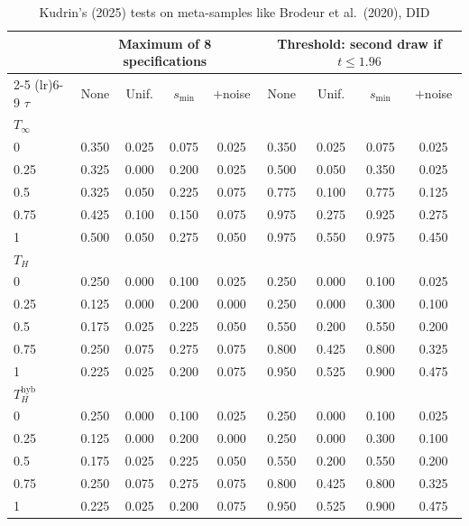 \begin{table}[htbp]
\centering
\caption{Kudrin's (2025) tests on meta-samples like Brodeur et al.\ (2020), DID}
\label{tab:brodeur_did_power_kudrin}
\footnotesize
\setlength{\tabcolsep}{4pt}
\begin{tabular}{lcccccccc}
\toprule
 & \multicolumn{4}{c}{Maximum of 8 specifications} & \multicolumn{4}{c}{Threshold: second draw if $t \le 1.96$} \\
\cmidrule(lr){2-5} \cmidrule(lr){6-9}
$\tau$ & None & Unif. & $s_{\min}$ & $+$noise & None & Unif. & $s_{\min}$ & $+$noise \\
\midrule
\multicolumn{9}{l}{\textit{$T_\infty$}} \\
0 & 0.350 & 0.025 & 0.075 & 0.025 & 0.350 & 0.025 & 0.075 & 0.025 \\
0.25 & 0.325 & 0.000 & 0.200 & 0.025 & 0.500 & 0.050 & 0.350 & 0.025 \\
0.5 & 0.325 & 0.050 & 0.225 & 0.075 & 0.775 & 0.100 & 0.775 & 0.125 \\
0.75 & 0.425 & 0.100 & 0.150 & 0.075 & 0.975 & 0.275 & 0.925 & 0.275 \\
1 & 0.500 & 0.050 & 0.275 & 0.050 & 0.975 & 0.550 & 0.975 & 0.450 \\
\midrule
\multicolumn{9}{l}{\textit{$T_H$}} \\
0 & 0.250 & 0.000 & 0.100 & 0.025 & 0.250 & 0.000 & 0.100 & 0.025 \\
0.25 & 0.125 & 0.000 & 0.200 & 0.000 & 0.250 & 0.000 & 0.300 & 0.100 \\
0.5 & 0.175 & 0.025 & 0.225 & 0.050 & 0.550 & 0.200 & 0.550 & 0.200 \\
0.75 & 0.250 & 0.075 & 0.275 & 0.075 & 0.800 & 0.425 & 0.800 & 0.325 \\
1 & 0.225 & 0.025 & 0.200 & 0.075 & 0.950 & 0.525 & 0.900 & 0.475 \\
\midrule
\multicolumn{9}{l}{\textit{$T_H^{\mathrm{hyb}}$}} \\
0 & 0.250 & 0.000 & 0.100 & 0.025 & 0.250 & 0.000 & 0.100 & 0.025 \\
0.25 & 0.125 & 0.000 & 0.200 & 0.000 & 0.250 & 0.000 & 0.300 & 0.100 \\
0.5 & 0.175 & 0.025 & 0.225 & 0.050 & 0.550 & 0.200 & 0.550 & 0.200 \\
0.75 & 0.250 & 0.075 & 0.275 & 0.075 & 0.800 & 0.425 & 0.800 & 0.325 \\
1 & 0.225 & 0.025 & 0.200 & 0.075 & 0.950 & 0.525 & 0.900 & 0.475 \\
\bottomrule
\end{tabular}

\end{table}
